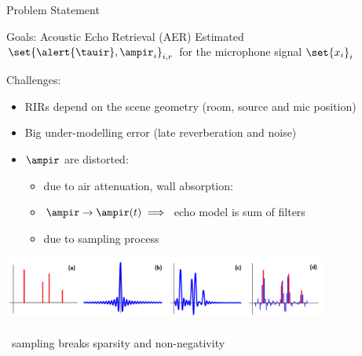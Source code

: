 




\begin{frame}{Problem Statement}

    \begin{mydefblock}{Goals: Acoustic Echo Retrieval (AER)}
        Estimated $\set{\alert{\tauir}, \ampir_i}_{i,r}$
        for the microphone signal $\set{x_i}_i$
    \end{mydefblock}

    \begin{block}{Challenges:}
        \begin{itemize}
            \item RIRs depend on the scene geometry (room, source and mic position)
            \item Big under-modelling error (late reverberation and noise)
            \item $\ampir$ are distorted:
            \begin{itemize}
                \item due to air attenuation, wall absorption:
                \item $\ampir \to \ampir(t) \implies$ echo model is sum of filters
                \item due to sampling process{\footnotesize~\cite{tukuljac2018mulan}}
            \end{itemize}
        \end{itemize}
    \end{block}

    \begin{center}
        \includegraphics[width=0.8\textwidth]{figures/basismismatch.png}
        \\{}
        \\{\small \textcolor{myred}{\iconAlert~sampling breaks sparsity and non-negativity}}
    \end{center}

\end{frame}

